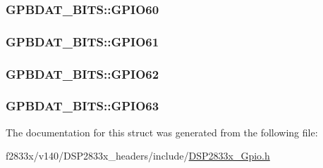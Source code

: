 \subsubsection[{G\+P\+I\+O60}]{ G\+P\+B\+D\+A\+T\+\_\+\+B\+I\+T\+S\+::\+G\+P\+I\+O60}\label{struct_g_p_b_d_a_t___b_i_t_s_aa245bcd9ef310f44691565ac0895f48c}
\hypertarget{struct_g_p_b_d_a_t___b_i_t_s_a91f775a7ee7035bc74564674013b6055}{}
\subsubsection[{G\+P\+I\+O61}]{ G\+P\+B\+D\+A\+T\+\_\+\+B\+I\+T\+S\+::\+G\+P\+I\+O61}\label{struct_g_p_b_d_a_t___b_i_t_s_a91f775a7ee7035bc74564674013b6055}
\hypertarget{struct_g_p_b_d_a_t___b_i_t_s_afb7e496d276f35e3984c5d73e8fa424d}{}
\subsubsection[{G\+P\+I\+O62}]{ G\+P\+B\+D\+A\+T\+\_\+\+B\+I\+T\+S\+::\+G\+P\+I\+O62}\label{struct_g_p_b_d_a_t___b_i_t_s_afb7e496d276f35e3984c5d73e8fa424d}
\hypertarget{struct_g_p_b_d_a_t___b_i_t_s_aaaf38817c792270457c168a2d47b1232}{}
\subsubsection[{G\+P\+I\+O63}]{ G\+P\+B\+D\+A\+T\+\_\+\+B\+I\+T\+S\+::\+G\+P\+I\+O63}\label{struct_g_p_b_d_a_t___b_i_t_s_aaaf38817c792270457c168a2d47b1232}


The documentation for this struct was generated from the following file\+:\begin{DoxyCompactItemize}
\item 
f2833x/v140/\+D\+S\+P2833x\+\_\+headers/include/\hyperlink{_d_s_p2833x___gpio_8h}{D\+S\+P2833x\+\_\+\+Gpio.\+h}\end{DoxyCompactItemize}
